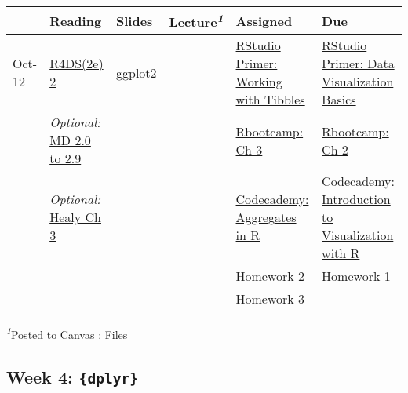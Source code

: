 \documentclass[
  letterpaper,
  DIV=11,
  numbers=noendperiod]{scrartcl}
\begin{document}
\setlength{\LTpost}{0mm}
\begin{longtable*}{llllll}
\toprule
 & Reading & Slides & Lecture\textsuperscript{\textit{1}} & Assigned & Due \\ 
\midrule\addlinespace[2.5pt]
Oct-12 & \href{https://r4ds.hadley.nz/data-visualize}{R4DS(2e) 2} & {ggplot2} &  & \href{https://posit.cloud/learn/primers/2.1}{RStudio Primer: Working with Tibbles} & \href{https://posit.cloud/learn/primers/1.1}{RStudio Primer: Data Visualization Basics} \\ 
 & \emph{Optional:} \href{https://moderndive.com/2-viz.html}{MD 2.0 to 2.9} &  &  & \href{https://r-bootcamp.netlify.app/chapter3}{Rbootcamp: Ch 3} & \href{https://r-bootcamp.netlify.app/chapter2}{Rbootcamp: Ch 2} \\ 
 & \emph{Optional:} \href{https://socviz.co/makeplot.html\#makeplot}{Healy Ch 3} &  &  & \href{https://www.codecademy.com/courses/learn-r/lessons/r-aggregates/exercises/introduction}{Codecademy: Aggregates in R} & \href{https://www.codecademy.com/courses/learn-r/lessons/intro-visualization-ggplot2-r/exercises/layers-and-geoms}{Codecademy: Introduction to Visualization with R} \\ 
 &  &  &  & Homework 2 & Homework 1 \\ 
 &  &  &  & Homework 3 &  \\ 
\bottomrule
\end{longtable*}
\begin{minipage}{\linewidth}
\textsuperscript{\textit{1}}Posted to Canvas : Files\\
\end{minipage}

\hypertarget{week-4-dplyr}{%
\subsection{\texorpdfstring{Week 4:
\texttt{\{dplyr\}}}{Week 4: \{dplyr\}}}\label{week-4-dplyr}}
\end{document}
